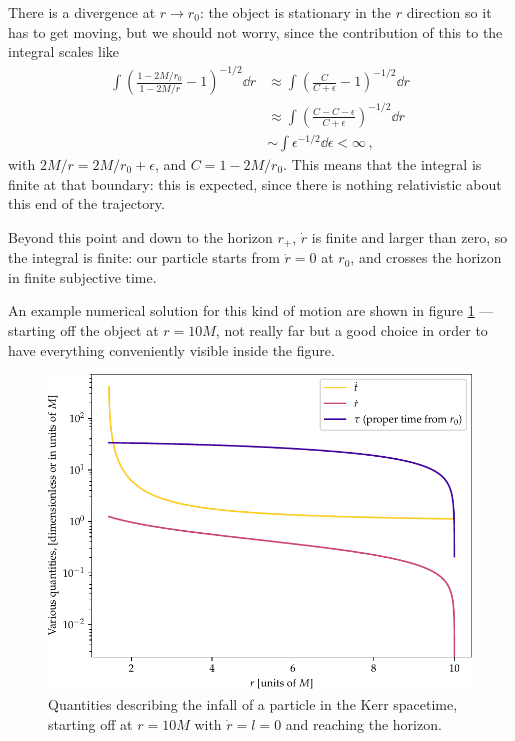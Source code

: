 \documentclass[main.tex]{subfiles}
\begin{document}
There is a divergence at \(r \to r_0 \): the object is stationary in the \(r\) direction so it has to get moving, but we should not worry, since the contribution of this to the integral scales like 
%
\begin{align}
\int \left(\frac{1 - 2M / r_0 }{1 - 2M / r} -1 \right)^{-1/2} \dd{r} &\approx \int \left(\frac{C }{C+ \epsilon } -1 \right)^{-1/2} \dd{r}  \\
&\approx \int \left(\frac{C - C - \epsilon }{C + \epsilon } \right)^{-1/2} \dd{r}  \\
&\sim \int \epsilon^{-1/2} \dd{\epsilon } < \infty 
\,,
\end{align}
%
with \(2M/r = 2M/r_0 + \epsilon \), and \(C = 1 - 2M/r_0 \).
This means that the integral is finite at that boundary: this is expected, since there is nothing relativistic about this end of the trajectory.

Beyond this point and down to the horizon \(r_+\), \(\dot{r}\) is finite and larger than zero, so the integral is finite: our particle starts from \(\dot{r} = 0\) at \(r_0 \), and crosses the horizon in finite subjective time.


An example numerical solution for this kind of motion are shown in figure \ref{fig:kerr_infall} --- starting off the object at \(r = 10M\), not really far but a good choice in order to have everything conveniently visible inside the figure.

\begin{figure}[ht]
\centering
\includegraphics[width=.9\textwidth]{figures/kerr_infall}
\caption{Quantities describing the infall of a particle in the Kerr spacetime, starting off at \(r = 10M\) with \(\dot{r} = l = 0\) and reaching the horizon.}
\label{fig:kerr_infall}
\end{figure}
\end{document}
